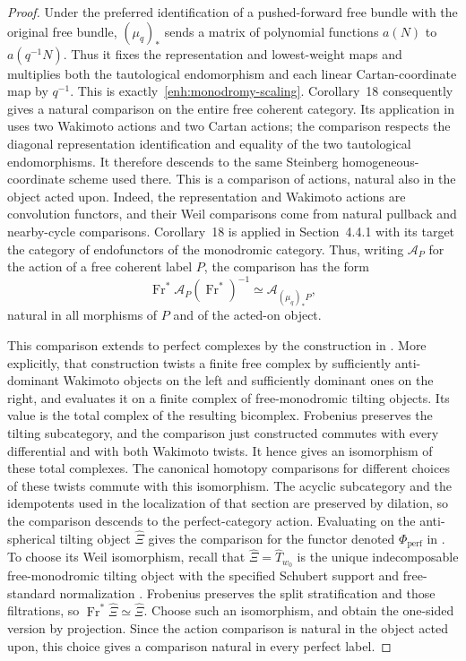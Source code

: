 \documentclass[11pt]{article}
\numberwithin{equation}{section}
\theoremstyle{definition}
\theoremstyle{remark}
\newcommand{\Fr}{\operatorname{Fr}}
\begin{document}
\begin{proof}
Under the preferred identification of a pushed-forward free bundle
with the original free bundle, $(\mu_q)_*$ sends a matrix of
polynomial functions $a(N)$ to $a(q^{-1}N)$.  Thus it fixes the
representation and lowest-weight maps and multiplies both the
tautological endomorphism and each linear Cartan-coordinate map by
$q^{-1}$.  This is exactly~\eqref{enh:monodromy-scaling}.
Corollary~18 consequently gives a natural comparison on the entire
free coherent category.  Its application in
\cite[Section~4.4.1]{Enh:Bezrukavnikov} uses two Wakimoto actions and
two Cartan actions; the comparison respects the diagonal
representation identification and equality of the two tautological
endomorphisms.  It therefore descends to the same Steinberg
homogeneous-coordinate scheme used there.
This is a comparison of actions, natural also in the object acted
upon.  Indeed, the representation and Wakimoto actions are
convolution functors, and their Weil comparisons come from natural
pullback and nearby-cycle comparisons.  Corollary~18 is applied in
Section~4.4.1 with its target the category of endofunctors of the
monodromic category.  Thus, writing $\mathcal A_P$ for the action
of a free coherent label $P$, the comparison has the form
\[
 \Fr^*\mathcal A_P(\Fr^*)^{-1}
       \simeq\mathcal A_{(\mu_q)_*P},
\]
natural in all morphisms of $P$ and of the acted-on object.

This comparison extends to perfect complexes by the construction in
\cite[Section~4.4.2]{Enh:Bezrukavnikov}.  More explicitly, that
construction twists a finite free complex by sufficiently
anti-dominant Wakimoto objects on the left and sufficiently dominant
ones on the right, and evaluates it on a finite
complex of free-monodromic tilting objects.  Its value is the total
complex of the resulting bicomplex.  Frobenius preserves the tilting
subcategory, and the comparison just constructed commutes with every
differential and with both Wakimoto twists.  It hence gives an
isomorphism of these total complexes.  The canonical homotopy
comparisons for different choices of these twists commute with this
isomorphism.  The acyclic subcategory and the idempotents used in
the localization of that section are preserved by dilation, so the
comparison descends to the perfect-category action.  Evaluating on
the anti-spherical tilting object $\widehat\Xi$ gives the comparison
for the functor denoted $\Phi_{\mathrm{perf}}$ in
\cite[Sections~5--6]{Enh:Bezrukavnikov}.  To choose its Weil
isomorphism, recall that $\widehat\Xi=\widehat T_{w_0}$ is the
unique indecomposable free-monodromic tilting object with the
specified Schubert support and free-standard normalization
\cite[Proposition~11(b) and Section~5]{Enh:Bezrukavnikov}.
Frobenius preserves the split stratification and those filtrations,
so $\Fr^*\widehat\Xi\simeq\widehat\Xi$.  Choose such an
isomorphism, and obtain the one-sided version by projection.
Since the action comparison is natural in the object acted upon,
this choice gives a comparison natural in every perfect label.


\end{proof}
\end{document}
